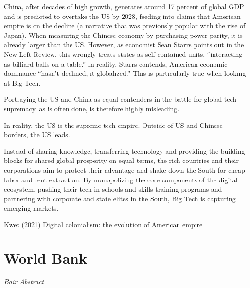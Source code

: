 \documentclass[
]{book}
\begin{document}
China, after decades of high growth, generates around 17 percent of global GDP and is predicted to overtake the US by 2028, feeding into claims that American empire is on the decline (a narrative that was previously popular with the rise of Japan). When measuring the Chinese economy by purchasing power parity, it is already larger than the US. However, as economist Sean Starrs points out in the New Left Review, this wrongly treats states as self-contained units, ``interacting as billiard balls on a table.'' In reality, Starrs contends, American economic dominance ``hasn't declined, it globalized.'' This is particularly true when looking at Big Tech.

Portraying the US and China as equal contenders in the battle for global tech supremacy, as is often done, is therefore highly misleading.

In reality, the US is the supreme tech empire. Outside of US and Chinese borders, the US leads.

Instead of sharing knowledge, transferring technology and providing the building blocks for shared global prosperity on equal terms, the rich countries and their corporations aim to protect their advantage and shake down the South for cheap labor and rent extraction. By monopolizing the core components of the digital ecosystem, pushing their tech in schools and skills training programs and partnering with corporate and state elites in the South, Big Tech is capturing emerging markets.

\href{https://roarmag.org/essays/digital-colonialism-the-evolution-of-american-empire}{Kwet (2021) Digital colonialism: the evolution of American empire}

\hypertarget{world-bank}{%
\section{World Bank}\label{world-bank}}

\emph{Bair Abstract}
\end{document}
